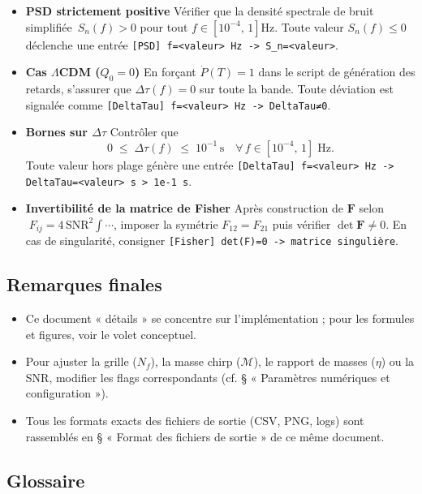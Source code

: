 \begin{itemize}
  \item \textbf{PSD strictement positive}  
    Vérifier que la densité spectrale de bruit simplifiée 
    \(\,S_{n}(f)>0\) pour tout 
    \(f\in[10^{-4},\,1]\)\;Hz.  
    Toute valeur \(S_{n}(f)\le0\) déclenche une entrée  
    \verb|[PSD] f=<valeur> Hz -> S_n=<valeur>|.

  \item \textbf{Cas \(\Lambda\)CDM (\(Q_{0}=0\))}  
    En forçant \(\dot P(T)=1\) dans le script de génération des retards,  
    s’assurer que \(\Delta\tau(f)=0\) sur toute la bande.  
    Toute déviation est signalée comme \verb|[DeltaTau] f=<valeur> Hz -> DeltaTau≠0|.

  \item \textbf{Bornes sur \(\Delta\tau\)}  
    Contrôler que 
    \[
      0 \;\le\;\Delta\tau(f)\;\le\;10^{-1}\,\mathrm{s}
      \quad\forall\,f\in[10^{-4},\,1]\;\mathrm{Hz}.
    \]
    Toute valeur hors plage génère une entrée  
    \verb|[DeltaTau] f=<valeur> Hz -> DeltaTau=<valeur> s > 1e-1 s|.

  \item \textbf{Invertibilité de la matrice de Fisher}  
    Après construction de 
    \(\mathbf{F}\) selon 
    \(\;F_{ij}=4\,\mathrm{SNR}^{2}\int\cdots\),  
    imposer la symétrie \(F_{12}=F_{21}\) puis vérifier 
    \(\det\mathbf{F}\neq0\).  
    En cas de singularité, consigner  
    \verb|[Fisher] det(F)=0 -> matrice singulière|.
\end{itemize}

\subsection{Remarques finales}
\begin{itemize}
  \item Ce document « détails » se concentre sur l’implémentation ; pour les formules et figures, voir le volet conceptuel.
  \item Pour ajuster la grille (\(N_f\)), la masse chirp (\(\mathcal{M}\)), le rapport de masses (\(\eta\)) ou la SNR, modifier les flags correspondants (cf. § « Paramètres numériques et configuration »).
  \item Tous les formats exacts des fichiers de sortie (CSV, PNG, logs) sont rassemblés en § « Format des fichiers de sortie » de ce même document.
\end{itemize}

\subsection*{Glossaire}

